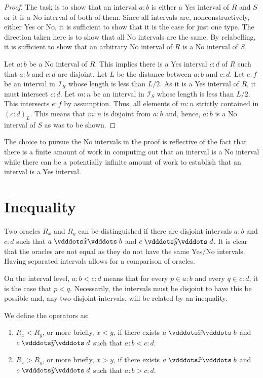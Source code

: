 \documentclass[12pt]{article}
\begin{document}
\begin{proof}\label{os:equal}
    The task is to show that an interval $a:b$ is either a Yes interval of $R$ and  $S$ or it is a No interval of both of them. Since all intervals are, nonconstructively, either Yes or No, it is sufficient to show that it is the case for just one type. The direction taken here is to show that all No intervals are the same. By relabelling, it is sufficient to show that an arbitrary No interval of $R$ is a No interval of $S$. 

    Let $a:b$ be a No interval of $R$. This implies there is a Yes interval $c:d$ of $R$ such that $a:b$ and $c:d$ are disjoint. Let $L$ be the distance between $a:b$ and $c:d$. Let $e:f$ be an interval in $\mathcal{I}_R$ whose length is less than $L/2$. As it is a Yes interval of $R$, it must intersect $c:d$. Let $m:n$ be an interval in $\mathcal{I}_S$ whose length is less than $L/2$. This intersects $e:f$ by assumption. Thus, all elements of $m:n$ strictly contained in $(c:d)_L$. This means that $m:n$ is disjoint from $a:b$ and, hence, $a:b$ is a No interval of $S$ as was to be shown. 
\end{proof} 

The choice to pursue the No intervals in the proof is reflective of the fact that there is a finite amount of work in computing out that an interval is a No interval while there can be a potentially infinite amount of work to establish that an interval is a Yes interval. 

\section{Inequality}

Two oracles $R_x$ and $R_y$ can be distinguished if there are disjoint intervals $a:b$ and $c:d$ such that $a \xora b$ and $c \xora[y] d$. It is clear that the oracles are not equal as they do not have the same Yes/No intervals. Having separated intervals allows for a comparison of oracles. 

On the interval level, $a:b < c:d$ means that for every $p \in a:b$ and every $q \in c:d$, it is the case that $p < q$. Necessarily, the intervals must be disjoint to have this be possible and, any two disjoint intervals, will be related by an inequality. 

We define the operators as:
\begin{enumerate}
    \item $R_x < R_y$, or more briefly, $x < y$, if there exists $a \xora b$ and $c \xora[y] d$ such that $a:b<c:d$.
    \item $R_x > R_y$, or more briefly, $x > y$, if there exists $a \xora b$ and $c \xora[y] d$ such that $a:b > c:d$.
\end{enumerate}
\end{document}
